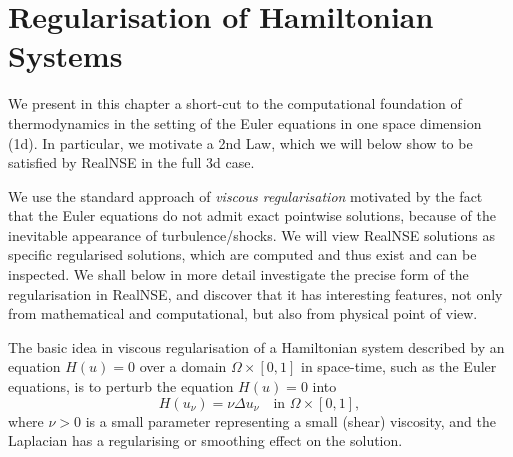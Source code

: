 \normalsize


\section{Regularisation of Hamiltonian Systems}

We present in this chapter a short-cut to the  
computational foundation of thermodynamics in the setting of the Euler
equations in one space dimension (1d). 
In particular, we motivate a 2nd Law,
which we will below show to be satisfied by RealNSE in the full 3d case. 

We use the standard approach of \emph{viscous regularisation}
motivated by the fact that the Euler equations do not admit exact pointwise solutions, 
because of the inevitable appearance of turbulence/shocks. 
We will view RealNSE solutions as specific regularised solutions, 
which are computed and thus exist and can be inspected.
We shall below in more detail investigate the precise form of
the regularisation in RealNSE, and discover that it has 
interesting features, not only from mathematical and computational,
but also from physical point of view. 

The basic idea in viscous regularisation of a Hamiltonian system
described by an equation $H(u)=0$ over a domain 
$\Omega\times [0,1]$ in space-time, such as the Euler equations, 
is to perturb the equation $H(u)=0$ into
\[
H(u_\nu )=\nu\Delta u_\nu \quad \mbox{in }\Omega\times [0,1],
\]
where $\nu >0$ is a small parameter representing a small (shear) viscosity,
and the Laplacian has a regularising or smoothing
effect on the solution.
 
